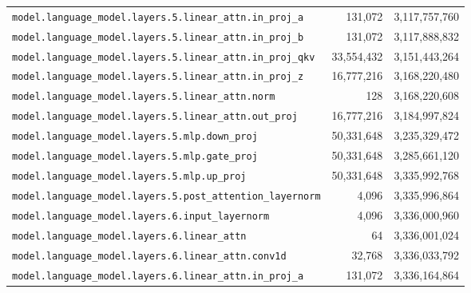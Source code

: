 \documentclass[10pt,a4paper]{article}
\theoremstyle{definition}
\begin{document}
\begin{appendices}
\begin{longtable}{p{9.5cm}rr}
\texttt{model.\allowbreak{}language\_model.\allowbreak{}layers.\allowbreak{}5.\allowbreak{}linear\_attn.\allowbreak{}in\_proj\_a} & 131,072 & 3,117,757,760 \\
\texttt{model.\allowbreak{}language\_model.\allowbreak{}layers.\allowbreak{}5.\allowbreak{}linear\_attn.\allowbreak{}in\_proj\_b} & 131,072 & 3,117,888,832 \\
\texttt{model.\allowbreak{}language\_model.\allowbreak{}layers.\allowbreak{}5.\allowbreak{}linear\_attn.\allowbreak{}in\_proj\_qkv} & 33,554,432 & 3,151,443,264 \\
\texttt{model.\allowbreak{}language\_model.\allowbreak{}layers.\allowbreak{}5.\allowbreak{}linear\_attn.\allowbreak{}in\_proj\_z} & 16,777,216 & 3,168,220,480 \\
\texttt{model.\allowbreak{}language\_model.\allowbreak{}layers.\allowbreak{}5.\allowbreak{}linear\_attn.\allowbreak{}norm} & 128 & 3,168,220,608 \\
\texttt{model.\allowbreak{}language\_model.\allowbreak{}layers.\allowbreak{}5.\allowbreak{}linear\_attn.\allowbreak{}out\_proj} & 16,777,216 & 3,184,997,824 \\
\texttt{model.\allowbreak{}language\_model.\allowbreak{}layers.\allowbreak{}5.\allowbreak{}mlp.\allowbreak{}down\_proj} & 50,331,648 & 3,235,329,472 \\
\texttt{model.\allowbreak{}language\_model.\allowbreak{}layers.\allowbreak{}5.\allowbreak{}mlp.\allowbreak{}gate\_proj} & 50,331,648 & 3,285,661,120 \\
\texttt{model.\allowbreak{}language\_model.\allowbreak{}layers.\allowbreak{}5.\allowbreak{}mlp.\allowbreak{}up\_proj} & 50,331,648 & 3,335,992,768 \\
\texttt{model.\allowbreak{}language\_model.\allowbreak{}layers.\allowbreak{}5.\allowbreak{}post\_attention\_layernorm} & 4,096 & 3,335,996,864 \\
\texttt{model.\allowbreak{}language\_model.\allowbreak{}layers.\allowbreak{}6.\allowbreak{}input\_layernorm} & 4,096 & 3,336,000,960 \\
\texttt{model.\allowbreak{}language\_model.\allowbreak{}layers.\allowbreak{}6.\allowbreak{}linear\_attn} & 64 & 3,336,001,024 \\
\texttt{model.\allowbreak{}language\_model.\allowbreak{}layers.\allowbreak{}6.\allowbreak{}linear\_attn.\allowbreak{}conv1d} & 32,768 & 3,336,033,792 \\
\texttt{model.\allowbreak{}language\_model.\allowbreak{}layers.\allowbreak{}6.\allowbreak{}linear\_attn.\allowbreak{}in\_proj\_a} & 131,072 & 3,336,164,864 \\

\end{longtable}
\end{appendices}
\end{document}
